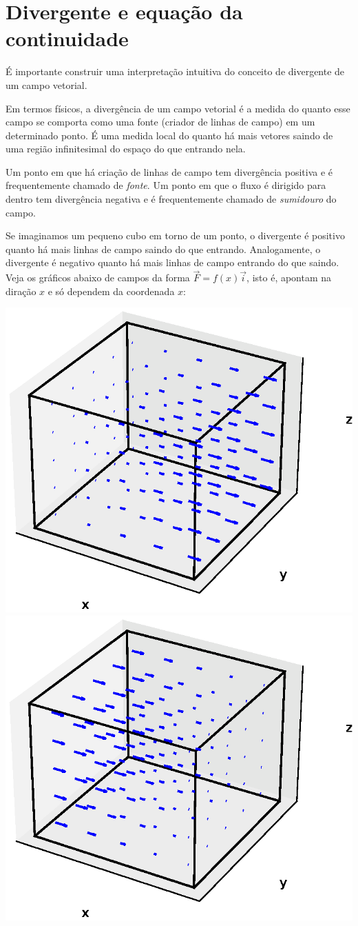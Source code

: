\section{Divergente e equação da continuidade}
É importante construir uma interpretação intuitiva do conceito de divergente de um campo vetorial.

Em termos físicos, a divergência de um campo vetorial é a medida do quanto esse campo se comporta como uma fonte (criador de linhas de campo) em um determinado ponto. É uma medida local do quanto há mais vetores saindo de uma região infinitesimal do espaço do que entrando nela. 

Um ponto em que há criação de linhas de campo tem divergência positiva e é frequentemente chamado de \emph{fonte}. Um ponto em que o fluxo é dirigido para dentro tem divergência negativa e é frequentemente chamado de \emph{sumidouro} do campo. 

Se imaginamos um pequeno cubo em torno de um ponto, o divergente é positivo quanto há mais linhas de campo saindo do que entrando. Analogamente, o divergente é negativo quanto há mais linhas de campo entrando do que saindo. Veja os gráficos abaixo de campos da forma $\vec{F}=f(x)\vec{i}$, isto é, apontam na diração $x$ e só dependem da coordenada $x$:

\includegraphics[width=.5\textwidth]{cap_campos/figs/campo_com_cubo_divergente_positivo}\includegraphics[width=.5\textwidth]{cap_campos/figs/campo_com_cubo_divergente_negativo}  

